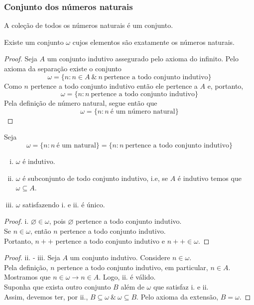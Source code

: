       \subsubsection{Conjunto dos números naturais}
         A coleção de todos os números naturais é um conjunto.
         \begin{theorem}
            Existe um conjunto $\omega$ cujos elementos são 
            exatamente os números naturais.
            \begin{proof}
               Seja $A$ um conjunto indutivo assegurado pelo axioma do infinito.
               Pelo axioma da separação existe o conjunto
               $$\omega = \{n:n \in A\ \&\ n\ 
               \textrm{pertence a todo conjunto indutivo}\}$$
               Como $n$ pertence a todo conjunto indutivo então ele pertence a 
               $A$ e, portanto, $$\omega = \{n: n\ 
               \textrm{pertence a todo conjunto indutivo}\}$$
               Pela definição de número natural, segue então que
               $$\omega = \{n: n\ \textrm{é um número natural}\}$$
            \end{proof}
         \end{theorem}
         \begin{theorem}
            Seja $$\omega = \{n: n\ \textrm{é um natural}\} = 
            \{n: n\ \textrm{pertence a todo conjunto indutivo}\}$$
            \begin{enumerate}[i.]
               \item $\omega$ é indutivo.
               \item $\omega$ é subconjunto de todo conjunto indutivo,
                  i.e, se $A$ é indutivo temos que $\omega \subseteq A$.
               \item $\omega$ satisfazendo i. e ii. é único.
            \end{enumerate}
            \begin{proof}
                i. $\varnothing \in \omega$, pois $\varnothing$ pertence a 
                todo conjunto indutivo.\\
                Se $n \in \omega$, então $n$ pertence a todo conjunto indutivo.\\
                Portanto, $n++$ pertence a todo conjunto indutivo e $n++ \in \omega$.
            \end{proof}
            \begin{proof}
                ii. - iii. Seja $A$ um conjunto indutivo. Considere $n\in \omega$.\\
                Pela definição, $n$ pertence a todo conjunto indutivo, 
                em particular, $n \in A$.\\ 
                Mostramos que $n \in \omega \rightarrow n \in A$. 
                Logo, ii. é válido.\\
                Suponha que exista outro conjunto $B$ além de $\omega$
                que satisfaz i. e ii.\\
                Assim, devemos ter, por ii., $B\subseteq \omega\ \&\
                \omega \subseteq B$. Pelo axioma da extensão, $B = \omega$.
            \end{proof}
         \end{theorem}
